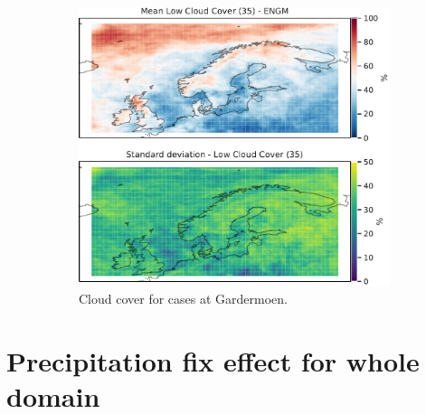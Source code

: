 \begin{figure}
    \begin{subfigure}[b]{0.5\textwidth}
    \centering
    \includegraphics[width=\textwidth]{Figures/CCENGM.pdf}
    \caption{Cloud cover for cases at Gardermoen.}
    \label{fig:ENGMCC}
\end{subfigure}
\caption{ }
\label{fig:cloudcoverairports}
\end{figure}

\section{Precipitation fix effect for whole domain}

